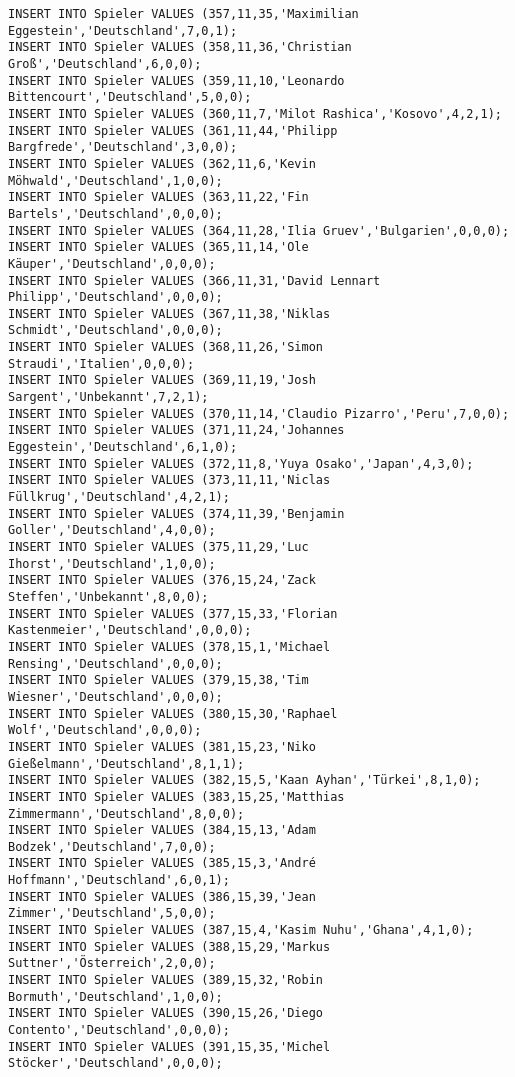 \documentclass{bschlangaul-aufgabe}
\begin{document}
\begin{verbatim}
INSERT INTO Spieler VALUES (357,11,35,'Maximilian Eggestein','Deutschland',7,0,1);
INSERT INTO Spieler VALUES (358,11,36,'Christian Groß','Deutschland',6,0,0);
INSERT INTO Spieler VALUES (359,11,10,'Leonardo Bittencourt','Deutschland',5,0,0);
INSERT INTO Spieler VALUES (360,11,7,'Milot Rashica','Kosovo',4,2,1);
INSERT INTO Spieler VALUES (361,11,44,'Philipp Bargfrede','Deutschland',3,0,0);
INSERT INTO Spieler VALUES (362,11,6,'Kevin Möhwald','Deutschland',1,0,0);
INSERT INTO Spieler VALUES (363,11,22,'Fin Bartels','Deutschland',0,0,0);
INSERT INTO Spieler VALUES (364,11,28,'Ilia Gruev','Bulgarien',0,0,0);
INSERT INTO Spieler VALUES (365,11,14,'Ole Käuper','Deutschland',0,0,0);
INSERT INTO Spieler VALUES (366,11,31,'David Lennart Philipp','Deutschland',0,0,0);
INSERT INTO Spieler VALUES (367,11,38,'Niklas Schmidt','Deutschland',0,0,0);
INSERT INTO Spieler VALUES (368,11,26,'Simon Straudi','Italien',0,0,0);
INSERT INTO Spieler VALUES (369,11,19,'Josh Sargent','Unbekannt',7,2,1);
INSERT INTO Spieler VALUES (370,11,14,'Claudio Pizarro','Peru',7,0,0);
INSERT INTO Spieler VALUES (371,11,24,'Johannes Eggestein','Deutschland',6,1,0);
INSERT INTO Spieler VALUES (372,11,8,'Yuya Osako','Japan',4,3,0);
INSERT INTO Spieler VALUES (373,11,11,'Niclas Füllkrug','Deutschland',4,2,1);
INSERT INTO Spieler VALUES (374,11,39,'Benjamin Goller','Deutschland',4,0,0);
INSERT INTO Spieler VALUES (375,11,29,'Luc Ihorst','Deutschland',1,0,0);
INSERT INTO Spieler VALUES (376,15,24,'Zack Steffen','Unbekannt',8,0,0);
INSERT INTO Spieler VALUES (377,15,33,'Florian Kastenmeier','Deutschland',0,0,0);
INSERT INTO Spieler VALUES (378,15,1,'Michael Rensing','Deutschland',0,0,0);
INSERT INTO Spieler VALUES (379,15,38,'Tim Wiesner','Deutschland',0,0,0);
INSERT INTO Spieler VALUES (380,15,30,'Raphael Wolf','Deutschland',0,0,0);
INSERT INTO Spieler VALUES (381,15,23,'Niko Gießelmann','Deutschland',8,1,1);
INSERT INTO Spieler VALUES (382,15,5,'Kaan Ayhan','Türkei',8,1,0);
INSERT INTO Spieler VALUES (383,15,25,'Matthias Zimmermann','Deutschland',8,0,0);
INSERT INTO Spieler VALUES (384,15,13,'Adam Bodzek','Deutschland',7,0,0);
INSERT INTO Spieler VALUES (385,15,3,'André Hoffmann','Deutschland',6,0,1);
INSERT INTO Spieler VALUES (386,15,39,'Jean Zimmer','Deutschland',5,0,0);
INSERT INTO Spieler VALUES (387,15,4,'Kasim Nuhu','Ghana',4,1,0);
INSERT INTO Spieler VALUES (388,15,29,'Markus Suttner','Österreich',2,0,0);
INSERT INTO Spieler VALUES (389,15,32,'Robin Bormuth','Deutschland',1,0,0);
INSERT INTO Spieler VALUES (390,15,26,'Diego Contento','Deutschland',0,0,0);
INSERT INTO Spieler VALUES (391,15,35,'Michel Stöcker','Deutschland',0,0,0);

\end{verbatim}
\end{document}
